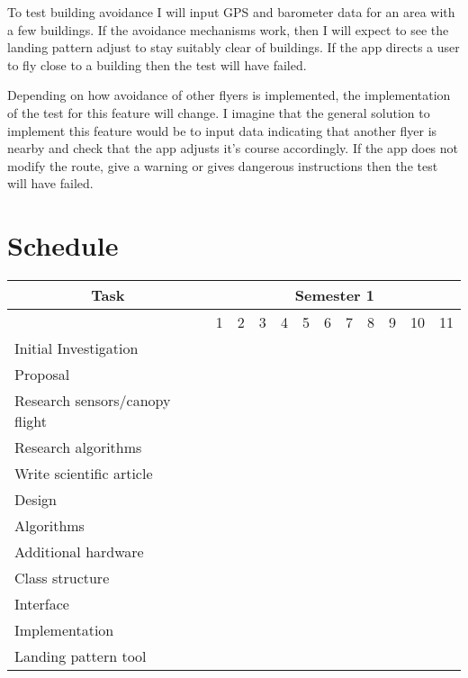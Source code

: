 \documentclass{article}
\begin{document}
To test building avoidance I will input GPS and barometer data for an area with a few buildings. If the avoidance mechanisms work, then I will expect to see the landing pattern adjust to stay suitably clear of buildings. If the app directs a user to fly close to a building then the test will have failed.

Depending on how avoidance of other flyers is implemented, the implementation of the test for this feature will change. I imagine that the general solution to implement this feature would be to input data indicating that another flyer is nearby and check that the app adjusts it's course accordingly. If the app does not modify the route, give a warning or gives dangerous instructions then the test will have failed.

\section{Schedule}

\begin{table}[H]
\begin{tabular}{@{}llllllllllll@{}}
\toprule
\multicolumn{1}{c}{Task} & \multicolumn{11}{c}{Semester 1} \\ \midrule
 & 1 & 2 & 3 & 4 & 5 & 6 & 7 & 8 & 9 & 10 & 11 \\ \midrule
Initial Investigation & \cellcolor[HTML]{34FF34} & \cellcolor[HTML]{34FF34} &  &  &  &  &  &  &  &  &  \\ \midrule
Proposal &  &  & \cellcolor[HTML]{34FF34}{\color[HTML]{000000} } &  &  &  &  &  &  &  &  \\ \midrule
Research sensors/canopy flight &  &  &  & \cellcolor[HTML]{34FF34} &  &  &  &  &  &  &  \\ \midrule
Research algorithms &  &  &  & \cellcolor[HTML]{34FF34} & \cellcolor[HTML]{34FF34} &  &  &  &  &  &  \\ \midrule
Write scientific article &  &  &  &  & \cellcolor[HTML]{34FF34} & \cellcolor[HTML]{34FF34} & \cellcolor[HTML]{34FF34} &  &  &  &  \\ \midrule
Design & \multicolumn{11}{l}{} \\ \midrule
\indent Algorithms &  &  &  &  & \cellcolor[HTML]{34FF34} &  &  &  &  &  &  \\ \midrule
\indent Additional hardware &  &  &  &  & \cellcolor[HTML]{34FF34} &  &  &  &  &  &  \\ \midrule
\indent Class structure &  &  &  &  &  & \cellcolor[HTML]{34FF34} &  &  &  &  &  \\ \midrule
\indent Interface &  &  &  &  &  & \cellcolor[HTML]{34FF34} &  &  &  &  &  \\ \midrule
Implementation & \multicolumn{11}{l}{} \\ \midrule
\indent Landing pattern tool &  &  &  &  &  &  &  & \cellcolor[HTML]{34FF34} & \cellcolor[HTML]{34FF34} & \cellcolor[HTML]{34FF34} & \cellcolor[HTML]{34FF34} \\ \bottomrule
\end{tabular}
\end{table}
\end{document}
